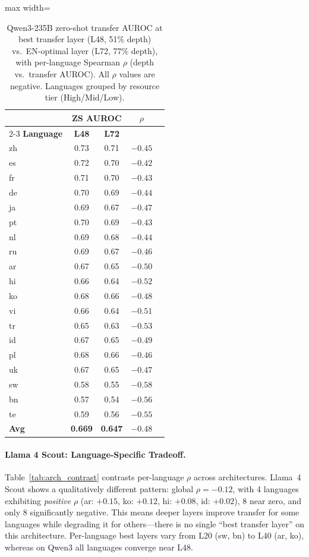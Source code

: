\documentclass[11pt,a4paper]{article}
\begin{document}
\begin{table}[t]
\centering
\small
\begin{adjustbox}{max width=\columnwidth}
\begin{tabular}{lcccc}
\toprule
& \multicolumn{2}{c}{\textbf{ZS AUROC}} & \multirow{2}{*}{\textbf{$\rho$}} \\
\cmidrule(lr){2-3}
\textbf{Language} & \textbf{L48} & \textbf{L72} & \\
\midrule
zh & 0.73 & 0.71 & $-0.45$ \\
es & 0.72 & 0.70 & $-0.42$ \\
fr & 0.71 & 0.70 & $-0.43$ \\
de & 0.70 & 0.69 & $-0.44$ \\
ja & 0.69 & 0.67 & $-0.47$ \\
pt & 0.70 & 0.69 & $-0.43$ \\
nl & 0.69 & 0.68 & $-0.44$ \\
ru & 0.69 & 0.67 & $-0.46$ \\
\midrule
ar & 0.67 & 0.65 & $-0.50$ \\
hi & 0.66 & 0.64 & $-0.52$ \\
ko & 0.68 & 0.66 & $-0.48$ \\
vi & 0.66 & 0.64 & $-0.51$ \\
tr & 0.65 & 0.63 & $-0.53$ \\
id & 0.67 & 0.65 & $-0.49$ \\
pl & 0.68 & 0.66 & $-0.46$ \\
uk & 0.67 & 0.65 & $-0.47$ \\
\midrule
sw & 0.58 & 0.55 & $-0.58$ \\
bn & 0.57 & 0.54 & $-0.56$ \\
te & 0.59 & 0.56 & $-0.55$ \\
\midrule
\textbf{Avg} & \textbf{0.669} & \textbf{0.647} & $-0.48$ \\
\bottomrule
\end{tabular}
\end{adjustbox}
\caption{Qwen3-235B zero-shot transfer AUROC at best transfer layer (L48, 51\% depth) vs.\ EN-optimal layer (L72, 77\% depth), with per-language Spearman $\rho$ (depth vs.\ transfer AUROC). All $\rho$ values are negative. Languages grouped by resource tier (High/Mid/Low).}
\label{tab:qwen_transfer}
\end{table}

\paragraph{Llama 4 Scout: Language-Specific Tradeoff.}
Table~\ref{tab:arch_contrast} contrasts per-language $\rho$ across architectures.
Llama~4 Scout shows a qualitatively different pattern: global $\rho = -0.12$, with 4 languages exhibiting \emph{positive} $\rho$ (ar: $+0.15$, ko: $+0.12$, hi: $+0.08$, id: $+0.02$), 8 near zero, and only 8 significantly negative.
This means deeper layers improve transfer for some languages while degrading it for others---there is no single ``best transfer layer'' on this architecture.
Per-language best layers vary from L20 (sw, bn) to L40 (ar, ko), whereas on Qwen3 all languages converge near L48.
\end{document}
